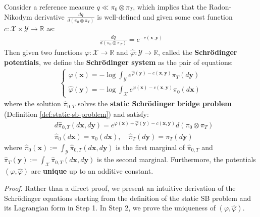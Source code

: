 \documentclass{article}
\begin{document}
\begin{proposition}
    Consider a reference measure $q\ll \pi_0\otimes \pi_T$, which implies that the Radon-Nikodym derivative $\frac{dq}{d(\pi_0\otimes \pi_T)}$ is well-defined and given some cost function $c:\mathcal{X}\times\mathcal{Y} \to \mathbb{R}$ as:
    \begin{align}
        \frac{dq}{d(\pi_0\otimes \pi_T)}=e^{-c(\boldsymbol{x},\boldsymbol{y})}
    \end{align}
    Then given two functions $\varphi:\mathcal{X}\to \mathbb{R}$ and $\hat{\varphi}:\mathcal{Y}\to \mathbb{R}$, called the \textbf{Schrödinger potentials}, we define the \textbf{Schrödinger system} as the pair of equations:
    \begin{align}
    \begin{cases}
        \varphi(\boldsymbol{x})=-\log\int_{\mathcal{Y}}e^{\hat{\varphi}(\boldsymbol{y})-c(\boldsymbol{x},\boldsymbol{y})}\pi_T(d\boldsymbol{y})\\
        \hat{\varphi}(\boldsymbol{y})=-\log\int_{\mathcal{X}}e^{\varphi(\boldsymbol{x})-c(\boldsymbol{x},\boldsymbol{y})}\pi_0(d\boldsymbol{x})\tag{Schrödinger System}\label{eq:schrodinger-system}
    \end{cases}
    \end{align}
    where the solution $\hat{\pi}_{0,T}$ solves the \textbf{static Schrödinger bridge problem} (Definition \ref{def:static-sb-problem}) and satisfy:
    \begin{align}
        &d\hat{\pi}_{0,T}(d\boldsymbol{x}, d\boldsymbol{y})=e^{\varphi(\boldsymbol{x})+\hat{\varphi}(\boldsymbol{y})-c(\boldsymbol{x}, \boldsymbol{y})}d(\pi_0\otimes \pi_T)\\
        &\hat{\pi}_0(d\boldsymbol{x})=\pi_0(d\boldsymbol{x}), \quad \hat{\pi}_T(d\boldsymbol{y})=\pi_T(d\boldsymbol{y})
    \end{align}
    where $\hat{\pi}_0(\boldsymbol{x}):= \int_{\mathcal{Y}}\hat{\pi}_{0,T}(d\boldsymbol{x}, d\boldsymbol{y})$ is the first marginal of $\hat{\pi}_{0,T}$ and $\hat{\pi}_{T}(\boldsymbol{y}):=\int_{\mathcal{X}}\hat{\pi}_{0,T}(d\boldsymbol{x}, d\boldsymbol{y})$ is the second marginal. Furthermore, the potentials $(\varphi, \hat{\varphi})$ are \textbf{unique} up to an additive constant.
\end{proposition}

\textit{Proof.} Rather than a direct proof, we present an intuitive derivation of the Schrödinger equations starting from the definition of the static SB problem and its Lagrangian form in Step 1. In Step 2, we prove the uniqueness of $(\varphi, \hat{\varphi})$. 
\end{document}
